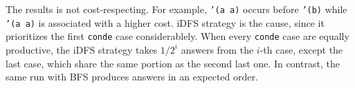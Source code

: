 \documentclass[format=acmlarge, review=true, authordraft=true]{acmart}
\begin{document}
\begin{center}
  \begin{tabular}{c}
   
   \end{tabular}
\end{center}

The results is not cost-respecting. For example, \texttt{'(a a)} occurs before
\texttt{'(b)} while \texttt{'(a a)} is associated with a higher cost. 
iDFS strategy is the cause, since it prioritizes the first \texttt{conde} case
considerablely. When every \texttt{conde} case are equally productive, the iDFS
strategy takes $1/2^{i}$ answers from the $i$-th case, except the last case,
which share the same portion as the second last one. In contrast, the same run 
with BFS produces answers in an expected order.

\begin{center}
  \begin{tabular}{c}
   
   \end{tabular}
\end{center}


% 
% 
% 
% 
% 
%   
 
\end{document}
